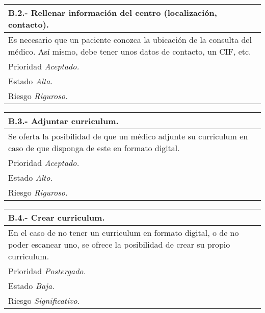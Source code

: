 	\begin{center}
	\begin{tabulary}{15cm}{|L|}
		\hline
			\bf{B.2.- Rellenar información del centro (localización, contacto).} \\
		\hline
			Es necesario que un paciente conozca la ubicación de la consulta del médico. Así mismo, debe tener unos datos de contacto, un CIF, etc. \\
		\hline
			Prioridad \textit{Aceptado.} \\
		\hline
			Estado \textit{Alta.} \\
		\hline
			Riesgo \textit{Riguroso.} \\
		\hline
	\end{tabulary}
	\end{center}

	\begin{center}
	\begin{tabulary}{15cm}{|L|}
		\hline
			\bf{B.3.- Adjuntar curriculum.} \\
		\hline
			Se oferta la posibilidad de que un médico adjunte su curriculum en caso de que disponga de este en formato digital. \\ 
		\hline
			Prioridad \textit{Aceptado.} \\
		\hline
			Estado \textit{Alto.} \\
		\hline
			Riesgo \textit{Riguroso.} \\
		\hline
	\end{tabulary}
	\end{center}

	\begin{center}
	\begin{tabulary}{15cm}{|L|}
		\hline
			\bf{B.4.- Crear curriculum.} \\
		\hline
			En el caso de no tener un curriculum en formato digital, o de no poder escanear uno, se ofrece la posibilidad de crear su propio curriculum. \\
		\hline
			Prioridad \textit{Postergado.} \\
		\hline
			Estado \textit{Baja.} \\
		\hline
			Riesgo \textit{Significativo.} \\
		\hline
	\end{tabulary}
	\end{center}


